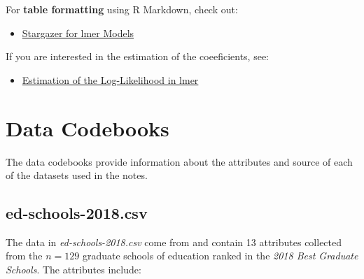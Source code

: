\documentclass[]{book}
\providecommand{\tightlist}{%
  \setlength{\itemsep}{0pt}\setlength{\parskip}{0pt}}
\begin{document}
For \textbf{table formatting} using R Markdown, check out:

\begin{itemize}
\tightlist
\item
  \href{http://svmiller.com/blog/2015/02/quasi-automating-the-inclusion-of-random-effects-in-rs-stargazer-package/}{Stargazer for lmer Models}
\end{itemize}

If you are interested in the estimation of the coeeficients, see:

\begin{itemize}
\tightlist
\item
  \href{http://stackoverflow.com/questions/20980116/how-does-lmer-from-the-r-package-lme4-compute-log-likelihood}{Estimation of the Log-Likelihood in lmer}
\end{itemize}

\hypertarget{data-codebook}{%
\chapter*{Data Codebooks}\label{data-codebook}}

The data codebooks provide information about the attributes and source of each of the datasets used in the notes.

\hypertarget{ed-schools-2018}{%
\section*{ed-schools-2018.csv}\label{ed-schools-2018}}

The data in \emph{ed-schools-2018.csv} come from \citet{USNWR:2018} and contain 13 attributes collected from the \(n=129\) graduate schools of education ranked in the \emph{2018 Best Graduate Schools}. The attributes include:
\end{document}
